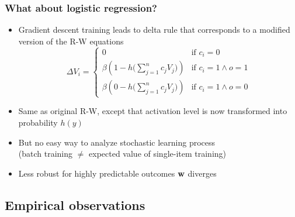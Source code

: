 \documentclass[t]{beamer} %
\begin{document}
\begin{frame}
  \frametitle{What about logistic regression?}

  \begin{itemize}
  \item Gradient descent training leads to delta rule that corresponds to a modified version of the R-W equations
    \[
    \Delta V_i =
    \begin{cases}
      0 & \text{if } c_i = 0\\
      \beta \left( 1 - h \bigl( \sum_{j=1}^n c_j V_j \bigr) \right) & \text{if } c_i = 1 \wedge o = 1 \\
      \beta \left( 0 - h \bigl( \sum_{j=1}^n c_j V_j \bigr) \right) & \text{if } c_i = 1 \wedge o = 0
    \end{cases}
    \]
  \item<2-> Same as original R-W, except that activation level is now transformed into probability $h(y)$
  \item<2-> But no easy way to analyze stochastic learning process\\
    (batch training $\neq$ expected value of single-item training)
  \item<2-> Less robust for highly predictable outcomes \so $\vw$ diverges
  \end{itemize}
\end{frame}

\subsection{Empirical observations}
\end{document}
